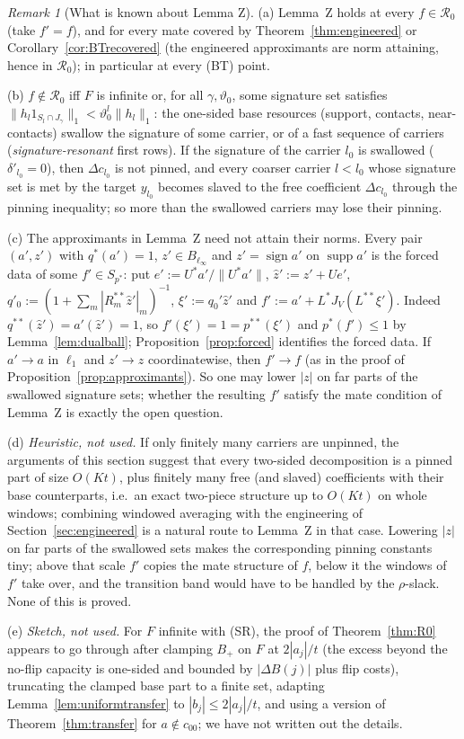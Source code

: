 \documentclass[10pt]{amsart}
\theoremstyle{definition}
\theoremstyle{remark}
\newtheorem{remark}[theorem]{Remark}
\newcommand{\supp}{\operatorname{supp}}
\newcommand{\sgn}{\operatorname{sign}}
\newcommand{\zh}{\hat z}
\begin{document}
\begin{remark}[What is known about Lemma Z]\label{rem:lemmaZ}
(a) Lemma~Z holds at every $f\in\mathcal R_0$ (take $f'=f$), and for every
mate covered by Theorem~\ref{thm:engineered} or
Corollary~\ref{cor:BTrecovered} (the engineered approximants are norm
attaining, hence in $\mathcal R_0$); in particular at every \textup{(BT)}
point.

(b) $f\notin\mathcal R_0$ iff $F$ is infinite or, for all $\gamma,\vartheta_0$,
some signature set satisfies $\|h_l1_{S_l\cap J_\gamma}\|_1<\vartheta_0^l
\|h_l\|_1$: the one-sided base resources (support, contacts,
near-contacts) swallow the signature of some carrier, or of a fast sequence
of carriers (\emph{signature-resonant} first rows).  If the signature of the
carrier $l_0$ is swallowed ($\delta'_{l_0}=0$), then $\Delta c_{l_0}$ is not
pinned, and every coarser carrier $l<l_0$ whose signature set is met by the
target $y_{l_0}$ becomes slaved to the free coefficient $\Delta c_{l_0}$
through the pinning inequality; so more than the swallowed carriers may
lose their pinning.

(c) The approximants in Lemma~Z need not attain their norms.  Every pair
$(a',z')$ with $q^*(a')=1$, $z'\in B_{\ell_\infty}$ and $z'=\sgn a'$ on
$\supp a'$ is the forced data of some $f'\in S_{p^*}$: put
$e':=U^*a'/\|U^*a'\|$, $\zh':=z'+Ue'$, $q'_0:=(1+\sum_m|R^{**}_m\zh'|_m)^{-1}$,
$\xi':=q_0'\zh'$ and $f':=a'+L^*J_V(L^{**}\xi')$.  Indeed $q^{**}(\zh')=
a'(\zh')=1$, so $f'(\xi')=1=p^{**}(\xi')$ and $p^*(f')\le1$ by
Lemma~\ref{lem:dualball}; Proposition~\ref{prop:forced} identifies the
forced data.  If $a'\to a$ in $\ell_1$ and $z'\to z$ coordinatewise, then
$f'\to f$ (as in the proof of Proposition~\ref{prop:approximants}).  So one
may lower $|z|$ on far parts of the swallowed signature sets; whether the
resulting $f'$ satisfy the mate condition of Lemma~Z is exactly the open
question.

(d) \emph{Heuristic, not used.}  If only finitely many carriers are unpinned,
the arguments of this section suggest that every two-sided decomposition is a
pinned part of size $O(Kt)$, plus finitely many free (and slaved)
coefficients with their base counterparts, i.e.\ an exact two-piece
structure up to $O(Kt)$ on whole windows; combining windowed averaging with
the engineering of Section~\ref{sec:engineered} is a natural route to
Lemma~Z in that case.  Lowering $|z|$ on far parts of the swallowed sets
makes the corresponding pinning constants tiny; above that scale $f'$
copies the mate structure of $f$, below it the windows of $f'$ take over,
and the transition band would have to be handled by the $\rho$-slack.
None of this is proved.

(e) \emph{Sketch, not used.}  For $F$ infinite with (SR), the proof of
Theorem~\ref{thm:R0} appears to go through after clamping $B_+$ on $F$ at
$2|a_j|/t$ (the excess beyond the no-flip capacity is one-sided and bounded
by $|\Delta B(j)|$ plus flip costs), truncating the clamped base part to a
finite set, adapting Lemma~\ref{lem:uniformtransfer} to $|b_j|\le2|a_j|/t$,
and using a version of Theorem~\ref{thm:transfer} for $a\notin c_{00}$; we
have not written out the details.
\end{remark}
\end{document}
